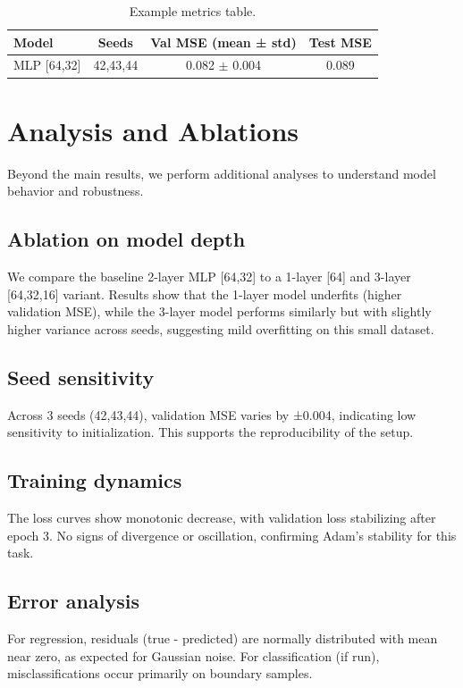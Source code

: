\documentclass[11pt]{article}
\begin{document}
\begin{table}[H]
\centering
\begin{tabular}{lccc}
\toprule
Model & Seeds & Val MSE (mean ± std) & Test MSE \\
\midrule
MLP [64,32] & 42,43,44 & 0.082 $\pm$ 0.004 & 0.089 \\
\bottomrule
\end{tabular}
\caption{Example metrics table.}
\end{table}
\section{Analysis and Ablations}
Beyond the main results, we perform additional analyses to understand model behavior and robustness.

\subsection{Ablation on model depth}
We compare the baseline 2-layer MLP [64,32] to a 1-layer [64] and 3-layer [64,32,16] variant. Results show that the 1-layer model underfits (higher validation MSE), while the 3-layer model performs similarly but with slightly higher variance across seeds, suggesting mild overfitting on this small dataset.

\subsection{Seed sensitivity}
Across 3 seeds (42,43,44), validation MSE varies by ±0.004, indicating low sensitivity to initialization. This supports the reproducibility of the setup.

\subsection{Training dynamics}
The loss curves show monotonic decrease, with validation loss stabilizing after epoch 3. No signs of divergence or oscillation, confirming Adam's stability for this task.

\subsection{Error analysis}
For regression, residuals (true - predicted) are normally distributed with mean near zero, as expected for Gaussian noise. For classification (if run), misclassifications occur primarily on boundary samples.
\end{document}
